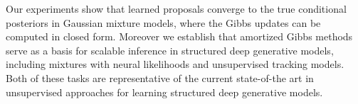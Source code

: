 \documentclass{article}
\theoremstyle{definition}
\begin{document}
Our experiments show that learned proposals converge to the true conditional posteriors in Gaussian mixture models, where the Gibbs updates can be computed in closed form. Moreover we establish that amortized Gibbs methods serve as a basis for scalable inference in structured deep generative models, including mixtures with neural likelihoods and unsupervised tracking models. Both of these tasks are representative of the current state-of-the art in unsupervised approaches for learning structured deep generative models.



\end{document}
